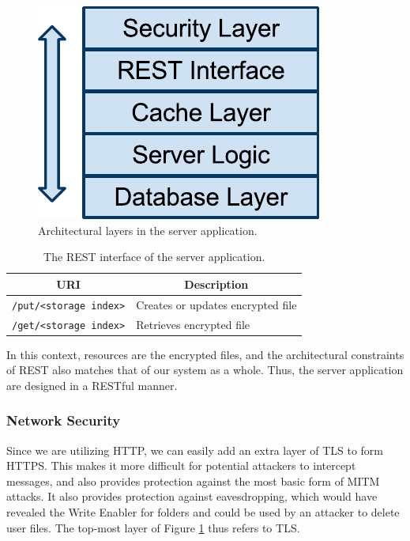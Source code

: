\documentclass[pdftex,english,10pt,b5paper,twoside]{book}
\begin{document}
\begin{figure}[h!]
    \centering
    \includegraphics[scale=0.6]{ImplementationServerLayers.pdf}
    \caption{Architectural layers in the server application.}
    \label{fig:IM:layers}
\end{figure}

\begin{table}[h!]
    \centering
    \caption{The \acs{REST} interface of the server application.}
    \begin{tabular}{|l|l|}
        \hline
        \multicolumn{1}{|c}{\textbf{\acs{URI}}} & \multicolumn{1}{|c|}{\textbf{Description}} \\
        \hline
        \texttt{/put/<storage index>} & Creates or updates encrypted file \\
        \hline
        \texttt{/get/<storage index>} & Retrieves encrypted file \\
        \hline
    \end{tabular}
    \label{tbl:IM:restinterface}
\end{table}

In this context, resources are the encrypted files, and the architectural
constraints of \ac{REST} also matches that of our system as a
whole. Thus, the server application are designed in a \acs{REST}ful manner.

\subsubsection{Network Security} Since we are utilizing \ac{HTTP}, we can
easily add an extra layer of \ac{TLS} to form \ac{HTTPS}. This makes it more
difficult for potential attackers to intercept messages, and also provides
protection against the most basic form of \ac{MITM} attacks. It also provides
protection against eavesdropping, which would have revealed the Write Enabler
for folders and could be used by an attacker to delete user files. The top-most
layer of Figure \ref{fig:IM:layers} thus refers to \ac{TLS}.
\end{document}
